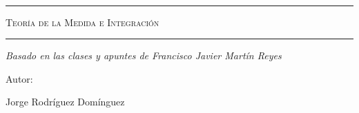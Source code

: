 \begin{titlepage}
\centering
{\bfseries\LARGE \ \par}
\vspace{1cm}{\scshape\Large \ \par}
\vspace{3cm}
\rule{\linewidth}{0.5mm}
{\scshape\Huge Teoría de la Medida e Integración \par}
\rule{\linewidth}{0.5mm} \par
\vspace{3cm}
{\itshape\Large Basado en las clases y apuntes de Francisco Javier Martín Reyes \par}
\vfill
{\Large Autor: \par}
{\Large Jorge Rodríguez Domínguez \par}
\vfill
\end{titlepage}

\tableofcontents